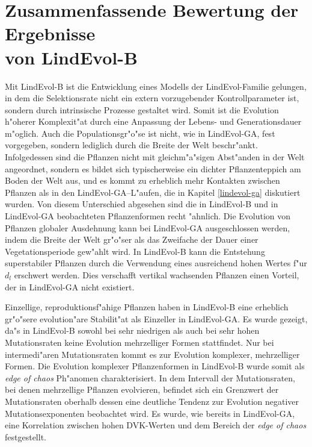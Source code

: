 \section[Zusammenfassung]{Zusammenfassende Bewertung der Ergebnisse \\ von LindEvol-B}
\label{lnd2-summary}

Mit LindEvol-B ist die Entwicklung eines Modells der LindEvol-Familie gelungen, in dem die Selektionsrate nicht
ein extern vorzugebender Kontrollparameter ist, sondern durch intrinsische Prozesse gestaltet wird. Somit ist
die Evolution h"oherer Komplexit"at durch eine Anpassung der Lebens- und Generationsdauer m"oglich. Auch die Populationsgr"o"se
ist nicht, wie in LindEvol-GA, fest vorgegeben, sondern lediglich durch die Breite der Welt beschr"ankt. Infolgedessen
sind die Pflanzen nicht mit gleichm"a"sigen Abst"anden in der Welt angeordnet, sondern es bildet sich typischerweise
ein dichter Pflanzenteppich am Boden der Welt aus, und es kommt zu erheblich mehr Kontakten zwischen Pflanzen als in
den LindEvol-GA--L"aufen, die in Kapitel \ref{lindevol-ga} diskutiert wurden. Von diesem Unterschied abgesehen sind
die in LindEvol-B und in LindEvol-GA beobachteten Pflanzenformen recht "ahnlich. Die Evolution von Pflanzen globaler
Ausdehnung kann bei LindEvol-GA ausgeschlossen werden, indem die Breite der Welt gr"o"ser als das Zweifache der Dauer
einer Vegetationsperiode gew"ahlt wird. In LindEvol-B kann die Entstehung superstabiler Pflanzen durch die Verwendung
eines ausreichend hohen Wertes f"ur $d_l$ erschwert werden. Dies verschafft vertikal wachsenden Pflanzen einen Vorteil,
der in LindEvol-GA nicht existiert.

Einzellige, reproduktionsf"ahige Pflanzen haben in LindEvol-B eine erheblich gr"o"sere evolution"are Stabilit"at als
Einzeller in LindEvol-GA. Es wurde gezeigt, da"s in LindEvol-B sowohl bei sehr niedrigen als auch bei sehr hohen Mutationsraten
keine Evolution mehrzelliger Formen stattfindet. Nur bei intermedi"aren Mutationsraten kommt es zur Evolution komplexer,
mehrzelliger Formen. Die Evolution komplexer Pflanzenformen in LindEvol-B wurde somit als \textsl{edge of chaos} Ph"anomen
charakterisiert. In dem Intervall der Mutationsraten, bei denen mehrzellige Pflanzen evolvieren, befindet sich ein Grenzwert
der Mutationsraten oberhalb dessen eine deutliche Tendenz zur Evolution negativer Mutationsexponenten beobachtet wird.
Es wurde, wie bereits in LindEvol-GA, eine Korrelation zwischen hohen DVK-Werten und dem Bereich der
\textsl{edge of chaos} festgestellt. 

